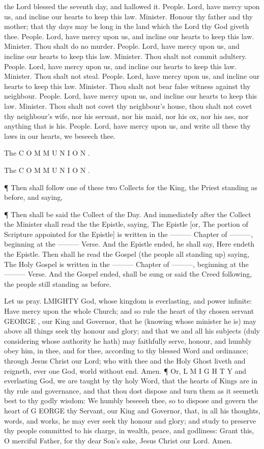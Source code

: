 the Lord blessed the seventh day, and hallowed it. People. Lord, have mercy upon us, and incline our hearts to keep this law. Minister. Honour thy father and thy mother; that thy days may be long in the land which the Lord thy God giveth thee. People. Lord, have mercy upon us, and incline our hearts to keep this law. Minister. Thou shalt do no murder. People. Lord, have mercy upon us, and incline our hearts to keep this law. Minister. Thou shalt not commit adultery. People. Lord, have mercy upon us, and incline our hearts to keep this law. Minister. Thou shalt not steal. People. Lord, have mercy upon us, and incline our hearts to keep this law. Minister. Thou shalt not bear false witness against thy neighbour. People. Lord, have mercy upon us, and incline our hearts to keep this law. Minister. Thou shalt not covet thy neighbour’s house, thou shalt not covet thy neighbour’s wife, nor his servant, nor his maid, nor his ox, nor his ass, nor anything that is his. People. Lord, have mercy upon us, and write all these thy laws in our hearts, we beseech thee.

The C O M M U N I O N .

The C O M M U N I O N .

¶ Then shall follow one of these two Collects for the King, the Priest standing as before, and saying,

¶ Then shall be said the Collect of the Day. And immediateIy after the Collect the Minister shall read the the Epistle, saying, The Epistle [or, The portion of Scripture appointed for the Epistle] is written in the ——— Chapter of ———, beginning at the ——— Verse. And the Epistle ended, he shall say, Here endeth the Epistle. Then shall he read the Gospel (the people all standing up) saying, The Holy Gospel is written in the ——— Chapter of ———, beginning at the ——— Verse. And the Gospel ended, shall be sung or said the Creed following, the people still standing as before.

Let us pray. LMIGHTY God, whose kingdom is everlasting, and power infinite: Have mercy upon the whole Church; and so rule the heart of thy chosen servant GEORGE , our King and Governor, that he (knowing whose minister he is) may above all things seek thy honour and glory; and that we and all his subjects (duly considering whose authority he hath) may faithfully serve, honour, and humbly obey him, in thee, and for thee, according to thy blessed Word and ordinance; through Jesus Christ our Lord; who with thee and the Holy Ghost liveth and reigneth, ever one God, world without end. Amen. ¶ Or, L M I G H T Y and everlasting God, we are taught by thy holy Word, that the hearts of Kings are in thy rule and governance, and that thou dost dispose and turn them as it seemeth best to thy godly wisdom: We humbly beseeeh thee, so to dispose and govern the heart of G EORGE thy Servant, our King and Governor, that, in all his thoughts, words, and works, he may ever seek thy honour and glory; and study to preserve thy people committed to his charge, in wealth, peace, and godliness: Grant this, O merciful Father, for thy dear Son’s sake, Jesus Christ our Lord. Amen.


